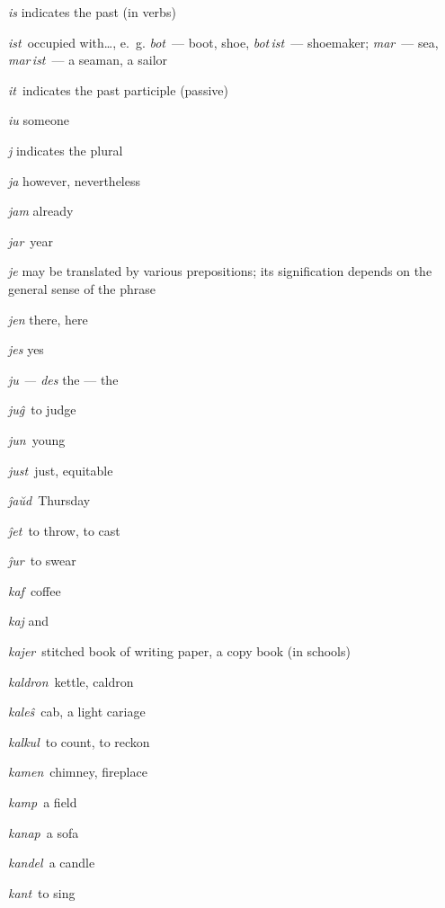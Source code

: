 \begin{landscape}
\begin{multicols}{5}
\begin{outdent}{1em}
\emph{is} indicates the past (in verbs)

\emph{ist\,} occupied with…, e.~g. \emph{bot\,} — boot, shoe, \emph{bot\,ist\,} — shoemaker; \emph{mar\,} — sea, \emph{mar\,ist\,} — a seaman, a sailor

\emph{it\,} indicates the past participle (passive)

\emph{iu} someone
\end{outdent}


\begin{outdent}{1em}
\emph{j} indicates the plural

\emph{ja} however, nevertheless

\emph{jam} already

\emph{jar\,} year

\emph{je} may be translated by various prepositions; its signification depends on the general sense of the phrase

\emph{jen} there, here

\emph{jes} yes

\emph{ju — des} the — the

\emph{juĝ\,} to judge

\emph{jun\,} young

\emph{just\,} just, equitable


\emph{ĵaŭd\,} Thursday

\emph{ĵet\,} to throw, to cast

\emph{ĵur\,} to swear
\end{outdent}


\begin{outdent}{1em}
\emph{kaf\,} coffee

\emph{kaj} and

\emph{kajer\,} stitched book of writing paper, a copy book (in schools)

\emph{kaldron\,} kettle, caldron

\emph{kaleŝ\,} cab, a light cariage

\emph{kalkul\,} to count, to reckon

\emph{kamen\,} chimney, fireplace

\emph{kamp\,} a field

\emph{kanap\,} a sofa

\emph{kandel\,} a candle

\emph{kant\,} to sing


\end{outdent}
\end{multicols}
\end{landscape}
